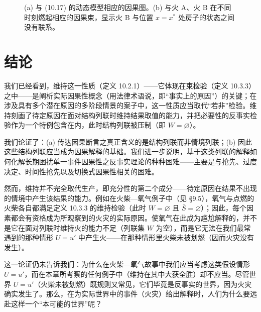 \begin{figure}[htbp]
\caption{(a) 与 \textup{(10.17)} 的动态模型相应的因果图。(b) 与火 A、火 B 在不同时刻燃起相应的因果束，显示火 B 与位置 $x=x^*$ 处房子的状态之间没有联系。}
\label{fig:10.7}
\end{figure}

\section{结论}

我们已经看到，维持这一性质（定义 10.2.1）——它体现在束检验（定义 10.3.3）之中——是阐析实际因果性概念（用法律术语说，即“事实上的原因”）的关键；在涉及具有多个潜在原因的多阶段情景的案子中，这一性质应当取代“若非”检验。维持刻画了待定原因在面对结构列联时维持结果取值的能力，并把必要性的反事实检验作为一个特例包含在内，此时结构列联被压制（即 $W=\varnothing$）。

我们论证了：(a) 传达因果断言之真正含义的是结构列联而非情境列联；(b) 因此这些结构列联应当成为因果解释的基础。我们进一步说明，基于这类列联的解释如何化解长期困扰单一事件因果性之反事实理论的种种困难——主要是与抢先、过度决定、时间性抢先以及切换式因果性相关的困难。

然而，维持并不完全取代生产，即充分性的第二个成分——待定原因在结果不出现的情境中产生该结果的能力。例如在火柴—氧气例子中（见 \S 9.5），氧气与点燃的火柴各自都满足定义 10.3.3 的维持检验（此时 $W=\varnothing$ 且 $\bar S=\varnothing$）；因此，每个因素都会有资格成为所观察到的火灾的实际原因。使氧气在此成为尴尬解释的，并不是它在面对列联时维持火的能力不足（列联集 $W$ 为空），而是它无法在我们最常遇到的那种情形 $U=u'$ 中产生火——在那种情形里火柴未被划燃（因而火灾没有发生）。

这一论证仍未告诉我们：为什么在火柴—氧气故事中我们应当考虑这类假设情形 $U=u'$，而在本章所考察的任何例子中（维持在其中大获全胜）却不应当。尽管世界 $U=u'$（火柴未被划燃）既规则又常见，它们毕竟是反事实的世界，因为火灾确实发生了。那么，在为实际世界中的事件（火灾）给出解释时，人们为什么要远赴这样一个“本可能的世界”呢？

